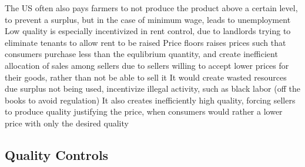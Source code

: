 \documentclass[11 pt, twoside]{article}
\newenvironment{outline*}
{
	\begin{outline}[enumerate]
	}
	{\end{outline}
}
\begin{document}
\begin{outline*}
\2 The US often also pays farmers to not produce the product above a certain level, to prevent a surplus, but in the case of minimum wage, leads to unemployment
\2 Low quality is especially incentivized in rent control, due to landlords trying to eliminate tenants to allow rent to be raised
\1 Price floors raises prices such that consumers purchase less than the equlibrium quantity, and create inefficient allocation of sales among sellers due to sellers willing to accept lower prices for their goods, rather than not be able to sell it
\2 It would create wasted resources due surplus not being used, incentivize illegal activity, such as black labor (off the books to avoid regulation)
\2 It also creates inefficiently high quality, forcing sellers to produce quality justifying the price, when consumers would rather a lower price with only the desired quality
\end{outline*}

\subsection{Quality Controls}
\begin{outline*}
\1
\end{outline*}
\end{document}
